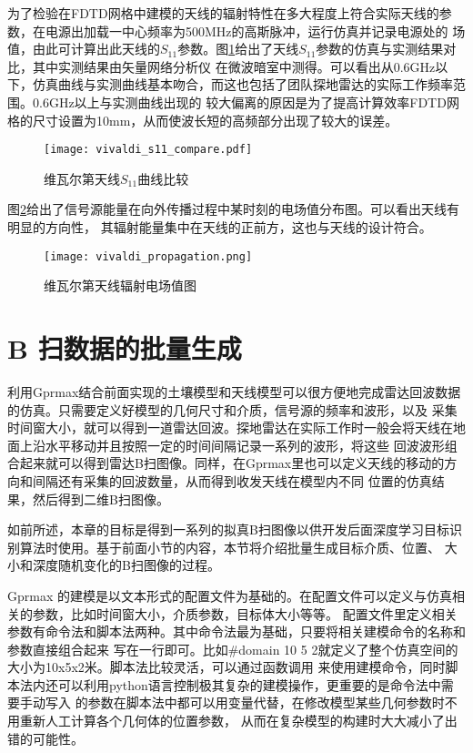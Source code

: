 为了检验在FDTD网格中建模的天线的辐射特性在多大程度上符合实际天线的参数，在电源出加载一中心频率为500MHz的高斯脉冲，运行仿真并记录电源处的
场值，由此可计算出此天线的$S_{11}$参数。图\ref{vivaldi_s11_compare}给出了天线$S_{11}$参数的仿真与实测结果对比，其中实测结果由矢量网络分析仪
在微波暗室中测得。可以看出从0.6GHz以下，仿真曲线与实测曲线基本吻合，而这也包括了团队探地雷达的实际工作频率范围。0.6GHz以上与实测曲线出现的
较大偏离的原因是为了提高计算效率FDTD网格的尺寸设置为10mm，从而使波长短的高频部分出现了较大的误差。
\begin{figure}[htbp]
	\texttt{[image: vivaldi\_s11\_compare.pdf]}
	\caption[]{维瓦尔第天线$S_{11}$曲线比较}
	\label{vivaldi_s11_compare}
\end{figure}

图\ref{vivaldi_propagation}给出了信号源能量在向外传播过程中某时刻的电场值分布图。可以看出天线有明显的方向性，
其辐射能量集中在天线的正前方，这也与天线的设计符合。
\begin{figure}[htbp]
	\texttt{[image: vivaldi\_propagation.png]}
	\caption[]{维瓦尔第天线辐射电场值图}
	\label{vivaldi_propagation}
\end{figure}
\section{B 扫数据的批量生成}
利用Gprmax结合前面实现的土壤模型和天线模型可以很方便地完成雷达回波数据的仿真。只需要定义好模型的几何尺寸和介质，信号源的频率和波形，以及
采集时间窗大小，就可以得到一道雷达回波。探地雷达在实际工作时一般会将天线在地面上沿水平移动并且按照一定的时间间隔记录一系列的波形，将这些
回波波形组合起来就可以得到雷达B扫图像。同样，在Gprmax里也可以定义天线的移动的方向和间隔还有采集的回波数量，从而得到收发天线在模型内不同
位置的仿真结果，然后得到二维B扫图像。

如前所述，本章的目标是得到一系列的拟真B扫图像以供开发后面深度学习目标识别算法时使用。基于前面小节的内容，本节将介绍批量生成目标介质、位置、
大小和深度随机变化的B扫图像的过程。

Gprmax 的建模是以文本形式的配置文件为基础的。在配置文件可以定义与仿真相关的参数，比如时间窗大小，介质参数，目标体大小等等。
配置文件里定义相关参数有命令法和脚本法两种。其中命令法最为基础，只要将相关建模命令的名称和参数直接组合起来
写在一行即可。比如\#domain 10 5 2就定义了整个仿真空间的大小为10x5x2米。脚本法比较灵活，可以通过函数调用
来使用建模命令，同时脚本法内还可以利用python语言控制极其复杂的建模操作，更重要的是命令法中需要手动写入
的参数在脚本法中都可以用变量代替，在修改模型某些几何参数时不用重新人工计算各个几何体的位置参数，
从而在复杂模型的构建时大大减小了出错的可能性。

